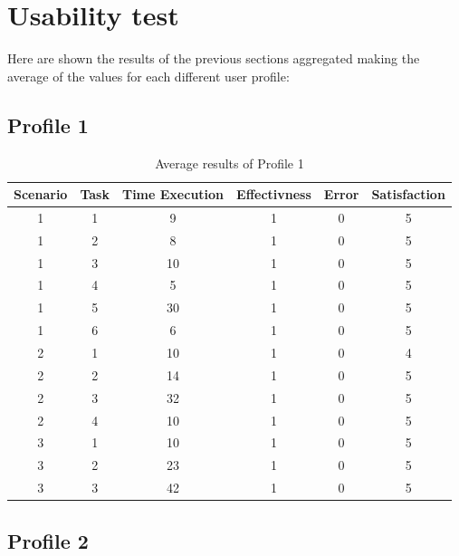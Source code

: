 \section{Usability test}
Here are shown the results of the previous sections aggregated making the average of the values for each different user profile:

\subsection{Profile 1}
\begin{table}[H]
  \begin{center}
    \begin{tabular}{||c|c|c|c|c|c||} %
      \textbf{Scenario} & \textbf{Task} & \textbf{Time Execution} & \textbf{Effectivness} & \textbf{Error} & \textbf{Satisfaction}\\
      
      \hline
        1 & 1 & 9 & 1 & 0 & 5\\
        1 & 2 & 8 & 1 & 0 & 5\\
        1 & 3 & 10 & 1 & 0 & 5\\
        1 & 4 & 5 & 1 & 0 & 5\\
        1 & 5 & 30 & 1 & 0 & 5\\
        1 & 6 & 6 & 1 & 0 & 5\\
        \hline
        2 & 1 & 10 & 1 & 0 & 4\\
        2 & 2 & 14 & 1 & 0 & 5\\
        2 & 3 & 32 & 1 & 0 & 5\\
        2 & 4 & 10 & 1 & 0 & 5\\
        \hline
        3 & 1 & 10 & 1 & 0 & 5\\
        3 & 2 & 23 & 1 & 0 & 5\\
        3 & 3 & 42 & 1 & 0 & 5\\
        \hline

    \end{tabular}
  \end{center}
  \caption{Average results of Profile 1}
\end{table}

\subsection{Profile 2}


